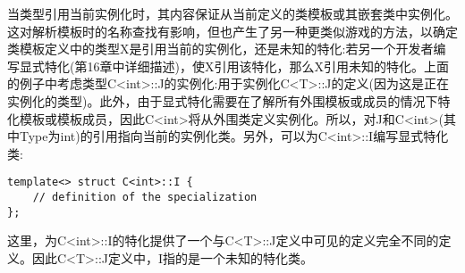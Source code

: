 当类型引用当前实例化时，其内容保证从当前定义的类模板或其嵌套类中实例化。这对解析模板时的名称查找有影响，但也产生了另一种更类似游戏的方法，以确定类模板定义中的类型X是引用当前的实例化，还是未知的特化:若另一个开发者编写显式特化(第16章中详细描述)，使X引用该特化，那么X引用未知的特化。上面的例子中考虑类型C<int>::J的实例化:用于实例化C<T>::J的定义(因为这是正在实例化的类型)。此外，由于显式特化需要在了解所有外围模板或成员的情况下特化模板或模板成员，因此C<int>将从外围类定义实例化。所以，对J和C<int>(其中Type为int)的引用指向当前的实例化类。另外，可以为C<int>::I编写显式特化类:

\begin{lstlisting}[style=styleCXX]
template<> struct C<int>::I {
	// definition of the specialization
};
\end{lstlisting}

这里，为C<int>::I的特化提供了一个与C<T>::J定义中可见的定义完全不同的定义。因此C<T>::J定义中，I指的是一个未知的特化类。


